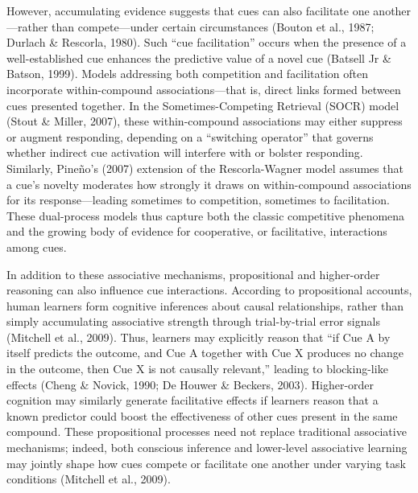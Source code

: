 \documentclass[
  letterpaper,
  DIV=11,
  numbers=noendperiod]{scrartcl}
\begin{document}
However, accumulating evidence suggests that cues can also facilitate
one another---rather than compete---under certain circumstances (Bouton
et al., 1987; Durlach \& Rescorla, 1980). Such ``cue facilitation''
occurs when the presence of a well-established cue enhances the
predictive value of a novel cue (Batsell Jr \& Batson, 1999). Models
addressing both competition and facilitation often incorporate
within-compound associations---that is, direct links formed between cues
presented together. In the Sometimes-Competing Retrieval (SOCR) model
(Stout \& Miller, 2007), these within-compound associations may either
suppress or augment responding, depending on a ``switching operator''
that governs whether indirect cue activation will interfere with or
bolster responding. Similarly, Pineño's (2007) extension of the
Rescorla-Wagner model assumes that a cue's novelty moderates how
strongly it draws on within-compound associations for its
response---leading sometimes to competition, sometimes to facilitation.
These dual-process models thus capture both the classic competitive
phenomena and the growing body of evidence for cooperative, or
facilitative, interactions among cues.

In addition to these associative mechanisms, propositional and
higher-order reasoning can also influence cue interactions. According to
propositional accounts, human learners form cognitive inferences about
causal relationships, rather than simply accumulating associative
strength through trial-by-trial error signals (Mitchell et al., 2009).
Thus, learners may explicitly reason that ``if Cue A by itself predicts
the outcome, and Cue A together with Cue X produces no change in the
outcome, then Cue X is not causally relevant,'' leading to blocking-like
effects (Cheng \& Novick, 1990; De Houwer \& Beckers, 2003).
Higher-order cognition may similarly generate facilitative effects if
learners reason that a known predictor could boost the effectiveness of
other cues present in the same compound. These propositional processes
need not replace traditional associative mechanisms; indeed, both
conscious inference and lower-level associative learning may jointly
shape how cues compete or facilitate one another under varying task
conditions (Mitchell et al., 2009).
\end{document}
